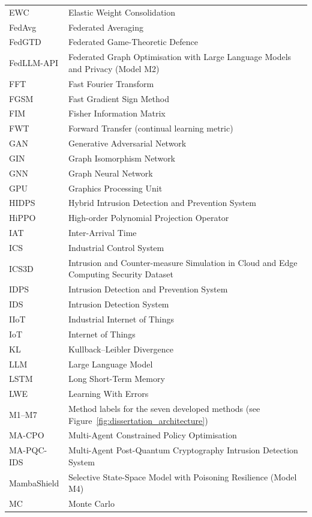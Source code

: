 \begin{longtable}{@{}p{3.8cm} p{10cm}@{}}
EWC & Elastic Weight Consolidation \\
FedAvg & Federated Averaging \\
FedGTD & Federated Game-Theoretic Defence \\
FedLLM-API & Federated Graph Optimisation with Large Language Models and Privacy (Model M2) \\
FFT & Fast Fourier Transform \\
FGSM & Fast Gradient Sign Method \\
FIM & Fisher Information Matrix \\
FWT & Forward Transfer (continual learning metric) \\
GAN & Generative Adversarial Network \\
GIN & Graph Isomorphism Network \\
GNN & Graph Neural Network \\
GPU & Graphics Processing Unit \\
HIDPS & Hybrid Intrusion Detection and Prevention System \\
HiPPO & High-order Polynomial Projection Operator \\
IAT & Inter-Arrival Time \\
ICS & Industrial Control System \\
ICS3D & Intrusion and Counter-measure Simulation in Cloud and Edge Computing Security Dataset \\
IDPS & Intrusion Detection and Prevention System \\
IDS & Intrusion Detection System \\
IIoT & Industrial Internet of Things \\
IoT & Internet of Things \\
KL & Kullback--Leibler Divergence \\
LLM & Large Language Model \\
LSTM & Long Short-Term Memory \\
LWE & Learning With Errors \\
M1--M7 & Method labels for the seven developed methods (see Figure~\ref{fig:dissertation_architecture}) \\
MA-CPO & Multi-Agent Constrained Policy Optimisation \\
MA-PQC-IDS & Multi-Agent Post-Quantum Cryptography Intrusion Detection System \\
MambaShield & Selective State-Space Model with Poisoning Resilience (Model M4) \\
MC & Monte Carlo \\

\end{longtable}
